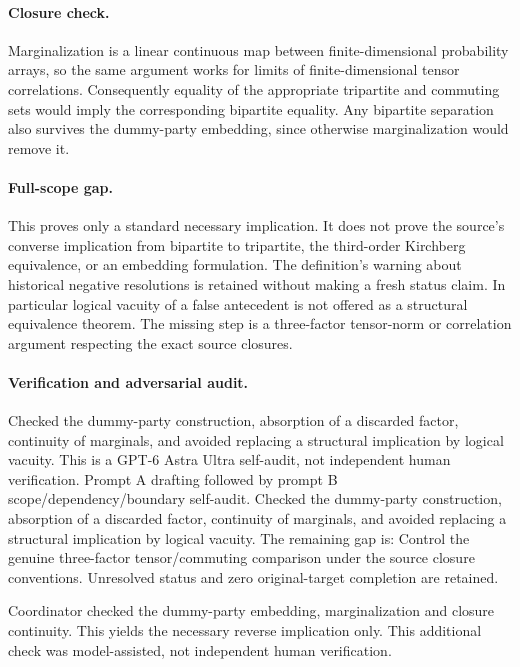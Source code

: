 \documentclass[11pt]{article}
\begin{document}
\paragraph{Closure check.} Marginalization is a linear continuous map between finite-dimensional probability arrays, so the same argument works for limits of finite-dimensional tensor correlations. Consequently equality of the appropriate tripartite and commuting sets would imply the corresponding bipartite equality. Any bipartite separation also survives the dummy-party embedding, since otherwise marginalization would remove it.
\paragraph{Full-scope gap.} This proves only a standard necessary implication. It does not prove the source's converse implication from bipartite to tripartite, the third-order Kirchberg equivalence, or an embedding formulation. The definition's warning about historical negative resolutions is retained without making a fresh status claim. In particular logical vacuity of a false antecedent is not offered as a structural equivalence theorem. The missing step is a three-factor tensor-norm or correlation argument respecting the exact source closures.

\paragraph{Verification and adversarial audit.}
Checked the dummy-party construction, absorption of a discarded factor, continuity of marginals, and avoided replacing a structural implication by logical vacuity. This is a GPT-6 Astra Ultra self-audit, not independent human verification. Prompt A drafting followed by prompt B scope/dependency/boundary self-audit. Checked the dummy-party construction, absorption of a discarded factor, continuity of marginals, and avoided replacing a structural implication by logical vacuity. The remaining gap is: Control the genuine three-factor tensor/commuting comparison under the source closure conventions. Unresolved status and zero original-target completion are retained.

Coordinator checked the dummy-party embedding, marginalization and closure continuity. This yields the necessary reverse implication only. This additional check was model-assisted, not independent human verification.
\end{document}
